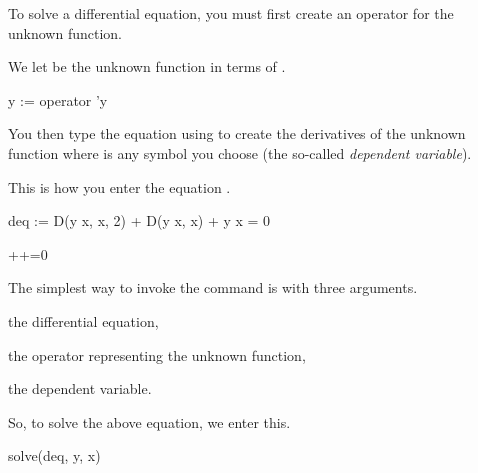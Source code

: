{{{{{{{{{{{{{{{{To solve a differential equation, you must first create an operator for
the unknown function.
%
\begin{xtc}
\begin{xtccomment}
We let  be the unknown function in terms of .
\end{xtccomment}
\begin{spadsrc}
y := operator 'y 
\end{spadsrc}
\begin{TeXOutput}
\begin{fricasmath}{1}
%
\end{fricasmath}
\end{TeXOutput}
\end{xtc}
%
You then type the equation using  to create the
derivatives of the unknown function  where  is any
symbol you choose (the so-called {\it dependent variable}).
%
\begin{xtc}
\begin{xtccomment}
This is how you enter
the equation .
\end{xtccomment}
\begin{spadsrc}
deq := D(y x, x, 2) + D(y x, x) + y x = 0
\end{spadsrc}
\begin{TeXOutput}
\begin{fricasmath}{2}
++=0%
\end{fricasmath}
\end{TeXOutput}
\end{xtc}
%
The simplest way to invoke the  command is with three
arguments.
\begin{items}
\item the differential equation,
\item the operator representing the unknown function,
\item the dependent variable.
\end{items}
%
\begin{xtc}
\begin{xtccomment}
So, to solve the above equation, we enter this.
\end{xtccomment}
\begin{spadsrc}
solve(deq, y, x) 
\end{spadsrc}

\end{xtc}}}}}}}}}}}}}}}}}
